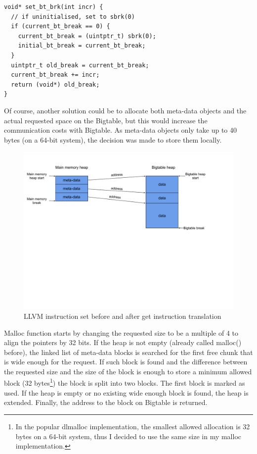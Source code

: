 \documentclass[bsc,frontabs,twoside,singlespacing,parskip,deptreport]{infthesis}     %
\begin{document}
\begin{lstlisting}[caption=set\_bt\_brk function implementation, label=setbtbrk, style=block]
void* set_bt_brk(int incr) {
  // if uninitialised, set to sbrk(0)
  if (current_bt_break == 0) {
    current_bt_break = (uintptr_t) sbrk(0);
    initial_bt_break = current_bt_break;
  }
  uintptr_t old_break = current_bt_break;
  current_bt_break += incr;
  return (void*) old_break;
}
\end{lstlisting}

Of course, another solution could be to allocate both meta-data objects and the actual requested space on the Bigtable, but this would increase the communication costs with Bigtable. As meta-data objects only take up to 40 bytes (on a 64-bit system), the decision was made to store them locally.

\begin{figure}[H]
\centering
\includegraphics[width=1\textwidth]{images/heap_organisation}
\caption{LLVM instruction set before and after get instruction translation}
\label{fig:heap_organisation}
\end{figure}

Malloc function starts by changing the requested size to be a multiple of 4 to align the pointers by 32 bits. If the heap is not empty (already called malloc() before), the linked list of meta-data blocks is searched for the first free chunk that is wide enough for the request. If such block is found and the difference between the requested size and the size of the block is enough to store a minimum allowed block (32 bytes\footnote{In the popular dlmalloc \citep{leadlmalloc} implementation, the smallest allowed allocation is 32 bytes on a 64-bit system, thus I decided to use the same size in my malloc implementation.}) the block is split into two blocks. The first block is marked as used. If the heap is empty or no existing wide enough block is found, the heap is extended. Finally, the address to the block on Bigtable is returned.
\end{document}
